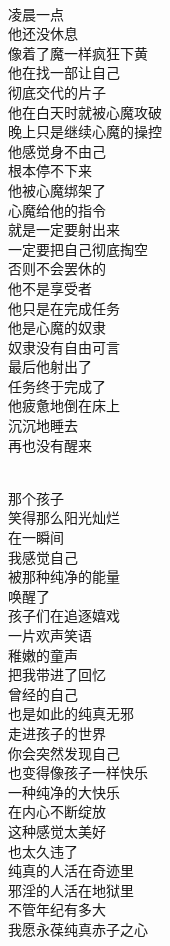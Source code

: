 \begin{poem}[完成任务的撸者]
    \begin{multicols}{3}
        \centering~\\
        凌晨一点 \\ 他还没休息 \\ 像着了魔一样疯狂下黄 \\ 他在找一部让自己 \\ 彻底交代的片子 \\ 他在白天时就被心魔攻破 \\ 晚上只是继续心魔的操控 \\ 他感觉身不由己 \\ 根本停不下来 \\ 他被心魔绑架了 \\ 心魔给他的指令 \\ 就是一定要射出来 \\ 一定要把自己彻底掏空 \\ 否则不会罢休的 \\ 他不是享受者 \\ 他只是在完成任务 \\ 他是心魔的奴隶 \\ 奴隶没有自由可言 \\ 最后他射出了 \\ 任务终于完成了 \\ 他疲惫地倒在床上 \\ 沉沉地睡去 \\ 再也没有醒来
    \end{multicols}
\end{poem}

\begin{poem}[依旧纯真]
    \begin{multicols}{3}
        \centering~\\
        那个孩子 \\ 笑得那么阳光灿烂 \\ 在一瞬间 \\ 我感觉自己 \\ 被那种纯净的能量 \\ 唤醒了 \\ 孩子们在追逐嬉戏 \\ 一片欢声笑语 \\ 稚嫩的童声 \\ 把我带进了回忆 \\ 曾经的自己 \\ 也是如此的纯真无邪 \\ 走进孩子的世界 \\ 你会突然发现自己 \\ 也变得像孩子一样快乐 \\ 一种纯净的大快乐 \\ 在内心不断绽放 \\ 这种感觉太美好 \\ 也太久违了 \\ 纯真的人活在奇迹里 \\ 邪淫的人活在地狱里 \\ 不管年纪有多大 \\ 我愿永葆纯真赤子之心
    \end{multicols}
\end{poem}

